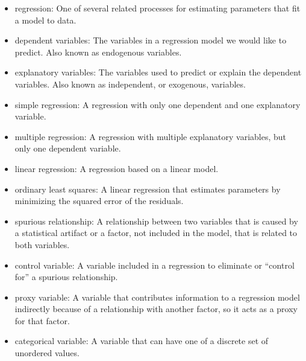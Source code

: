 \documentclass[12pt]{book}
\theoremstyle{exercise}
\begin{document}
\begin{itemize}

\item regression: One of several related processes for estimating parameters
that fit a model to data.%

\item dependent variables: The variables in a regression model we would
like to predict.  Also known as endogenous variables.%
%

\item explanatory variables: The variables used to predict or explain
the dependent variables.  Also known as independent, or exogenous,
variables.%
%

\item simple regression: A regression with only one dependent and
one explanatory variable.%

\item multiple regression: A regression with multiple explanatory
variables, but only one dependent variable.%

\item linear regression: A regression based on a linear model.%

\item ordinary least squares: A linear regression that estimates
parameters by minimizing the squared error of the residuals.%

\item spurious relationship: A relationship between two variables that is 
caused by a statistical artifact or a factor, not included in the
model, that is related to both variables.%

\item control variable: A variable included in a regression to
eliminate or ``control for'' a spurious relationship.%

\item proxy variable: A variable that contributes information to
a regression model indirectly because of a relationship with another
factor, so it acts as a proxy for that factor.%

\item categorical variable: A variable that can have one of a
discrete set of unordered values.%


\end{itemize}
\end{document}
